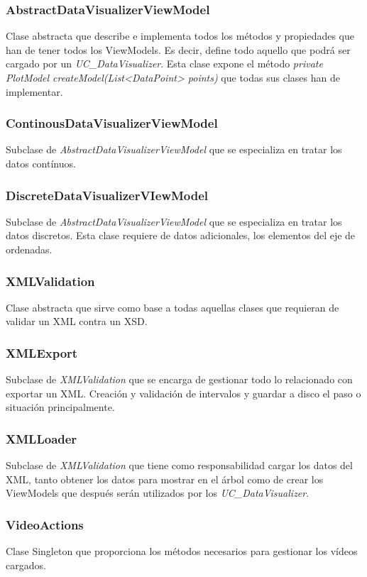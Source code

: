 \subsubsection{AbstractDataVisualizerViewModel}
Clase abstracta que describe e implementa todos los m\'etodos y propiedades que han de tener todos los ViewModels. Es decir,
define todo aquello que podr\'a ser cargado por un \emph{UC\_DataVisualizer}. Esta clase expone el m\'etodo
\emph{private PlotModel createModel(List<DataPoint> points)}
que todas sus clases han de implementar.

\subsubsection{ContinousDataVisualizerViewModel}
Subclase de \emph{AbstractDataVisualizerViewModel} que se especializa en tratar los datos cont\'inuos. 

\subsubsection{DiscreteDataVisualizerVIewModel}
Subclase de \emph{AbstractDataVisualizerViewModel} que se especializa en tratar los datos discretos.
Esta clase requiere de datos adicionales, los elementos del eje de ordenadas.

\subsubsection{XMLValidation}
Clase abstracta que sirve como base a todas aquellas clases que requieran de validar un XML contra un XSD.

\subsubsection{XMLExport}
Subclase de \emph{XMLValidation} que se encarga de gestionar todo lo relacionado con exportar un XML. Creaci\'on y
validaci\'on de intervalos y guardar a disco el paso o situaci\'on principalmente.

\subsubsection{XMLLoader}
Subclase de \emph{XMLValidation} que tiene como responsabilidad cargar los datos del XML, tanto obtener los datos
para mostrar en el \'arbol como de crear los ViewModels que despu\'es ser\'an utilizados por los \emph{UC\_DataVisualizer}.

\subsubsection{VideoActions}
Clase Singleton que proporciona los m\'etodos necesarios para gestionar los v\'ideos cargados.

